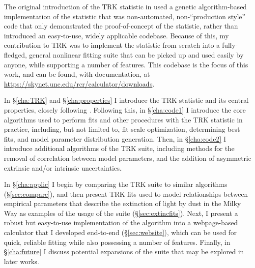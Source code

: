 The original introduction of the TRK statistic in \textcite{trotter} used a genetic algorithm-based implementation of the statistic that was non-automated, non-``production style'' code that only demonstrated the proof-of-concept of the statistic, rather than introduced an easy-to-use, widely applicable codebase. Because of this, my contribution to TRK was to implement the statistic from scratch into a fully-fledged, general nonlinear fitting suite that can be picked up and used easily by anyone, while supporting a number of features. This codebase is the focus of this work, and can be found, with documentation, at \url{https://skynet.unc.edu/rcr/calculator/downloads}.

In \S\ref{cha:TRK} and \S\ref{cha:properties} I introduce the TRK statistic and its central properties, closely following \textcite{trotter}. Following this, in \S\ref{cha:code1} I introduce the core algorithms used to perform fits and other procedures with the TRK statistic in practice, including, but not limited to, fit scale optimization, determining best fits, and model parameter distribution generation. Then, in \S\ref{cha:code2} I introduce additional algorithms of the TRK suite, including methods for the removal of correlation between model parameters, and the addition of asymmetric extrinsic and/or intrinsic uncertainties.

In \S\ref{cha:applic} I begin by comparing the TRK suite to similar algorithms (\S\ref{sec:compare}), and then present TRK fits used to model relationships between empirical parameters that describe the extinction of light by dust in the Milky Way as examples of the usage of the suite (\S\ref{sec:extincfits}). Next, I present a robust but easy-to-use implementation of the algorithm into a webpage-based calculator that I developed end-to-end (\S\ref{sec:website}), which can be used for quick, reliable fitting while also possessing a number of features. Finally, in \S\ref{cha:future} I discuss potential expansions of the suite that may be explored in later works.

